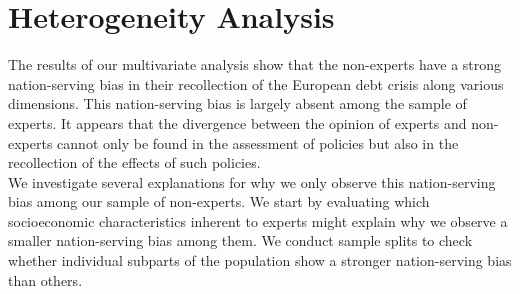 
\clearpage
\section{Heterogeneity Analysis}
 
The results of our multivariate analysis show that the non-experts have a strong nation-serving bias in their recollection of the European debt crisis along various dimensions. This nation-serving bias is largely absent among the sample of experts. It appears that the divergence between the opinion of experts and non-experts cannot only be found in the assessment of policies but also in the recollection of the effects of such policies. \\
We investigate several explanations for why we only observe this nation-serving bias among our sample of non-experts. 
We start by evaluating which socioeconomic characteristics inherent to experts might explain why we observe a smaller nation-serving bias among them. We conduct sample splits to check whether individual subparts of the population show a stronger nation-serving bias than others.
\\

